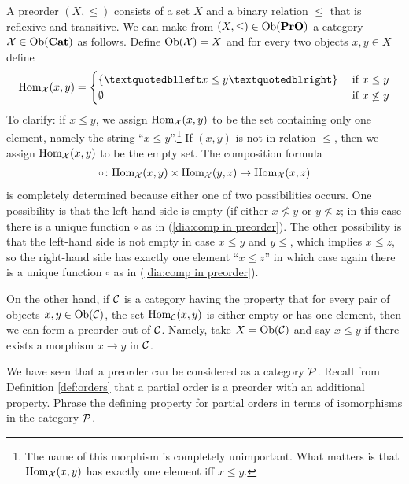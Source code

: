 \documentclass[CT4S-EN-RU]{subfiles}
\begin{document}
\begin{blockENG}
A preorder $(X,\leq)$ consists of a set $X$ and a binary relation $\leq$ that is reflexive and transitive. We can make from $(X,\leq)\in\textnormal{Ob}({\bf PrO})$ a category $\mathcal{X}\in\textnormal{Ob}({\bf Cat})$ as follows. Define $\textnormal{Ob}(\mathcal{X})=X$ and for every two objects $x,y\in X$ define 
$$\Hom_\mcX(x,y)=\begin{cases}\{“x\leq y”\}&\tn{ if } x\leq y\\\emptyset&\tn{ if } x\not\leq y\end{cases}$$
To clarify: if $x\leq y$, we assign $\textnormal{Hom}_\mathcal{X}(x,y)$ to be the set containing only one element, namely the string “$x\leq y$”.\footnote{The name of this morphism is completely unimportant. What matters is that $\textnormal{Hom}_\mathcal{X}(x,y)$ has exactly one element iff $x\leq y$.} If $(x,y)$ is not in relation $\leq$, then we assign $\textnormal{Hom}_\mathcal{X}(x,y)$ to be the empty set. The composition formula 
\begin{align}\label{dia:comp in preorder}
\circ\colon\textnormal{Hom}_\mathcal{X}(x,y)\times\textnormal{Hom}_\mathcal{X}(y,z)\rightarrow\textnormal{Hom}_\mathcal{X}(x,z)
\end{align}
is completely determined because either one of two possibilities occurs. One possibility is that the left-hand side is empty (if either $x\not\leq y$ or $y\not\leq z$; in this case there is a unique function $\circ$ as in (\ref{dia:comp in preorder}). The other possibility is that the left-hand side is not empty in case $x\leq y$ and $y\leq$, which implies $x\leq z$, so the right-hand side has exactly one element $“x\leq z”$ in which case again there is a unique function $\circ$ as in (\ref{dia:comp in preorder}).
\end{blockENG}

\begin{blockRUS}
\end{blockRUS}

\begin{blockENG}
On the other hand, if $\mathcal{C}$ is a category having the property that for every pair of objects $x,y\in\textnormal{Ob}(\mathcal{C})$, the set $\textnormal{Hom}_\mathcal{C}(x,y)$ is either empty or has one element, then we can form a preorder out of $\mathcal{C}$. Namely, take $X=\textnormal{Ob}(\mathcal{C})$ and say $x\leq y$ if there exists a morphism $x\to y$ in $\mathcal{C}$. 
\end{blockENG}

\begin{blockRUS}
\end{blockRUS}

\begin{exerciseENG}
We have seen that a preorder can be considered as a category $\mathcal{P}$. Recall from Definition \ref{def:orders} that a partial order is a preorder with an additional property. Phrase the defining property for partial orders in terms of isomorphisms in the category $\mathcal{P}$.
\end{exerciseENG}
\end{document}
